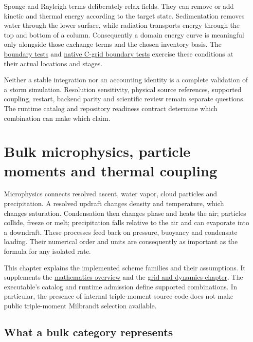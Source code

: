\documentclass[
  11pt,
]{report}
\begin{document}
Sponge and Rayleigh terms deliberately relax fields. They can remove or
add kinetic and thermal energy according to the target state.
Sedimentation removes water through the lower surface, while radiation
transports energy through the top and bottom of a column. Consequently a
domain energy curve is meaningful only alongside those exchange terms
and the chosen inventory basis. The
\href{../tests/dynamics/test_cartesian_boundary_conditions.cpp}{boundary
tests} and
\href{../tests/dynamics/test_native_cgrid_boundary.cpp}{native C-grid
boundary tests} exercise these conditions at their actual locations and
stages.

Neither a stable integration nor an accounting identity is a complete
validation of a storm simulation. Resolution sensitivity, physical
source references, supported coupling, restart, backend parity and
scientific review remain separate questions. The runtime catalog and
repository readiness contract determine which combination can make which
claim.



\chapter{Bulk microphysics, particle moments and thermal
coupling}\label{microphysics-theory}

Microphysics connects resolved ascent, water vapor, cloud particles and
precipitation. A resolved updraft changes density and temperature, which
changes saturation. Condensation then changes phase and heats the air;
particles collide, freeze or melt; precipitation falls relative to the
air and can evaporate into a downdraft. These processes feed back on
pressure, buoyancy and condensate loading. Their numerical order and
units are consequently as important as the formula for any isolated
rate.

This chapter explains the implemented scheme families and their
assumptions. It supplements the \href{MATHEMATICS.pdf}{mathematics
overview} and the \hyperref[grid-theory]{grid and dynamics chapter}. The
executable's catalog and runtime admission define supported
combinations. In particular, the presence of internal triple-moment
source code does not make public triple-moment Milbrandt selection
available.

\section{What a bulk category
represents}\label{what-a-bulk-category-represents}
\end{document}
